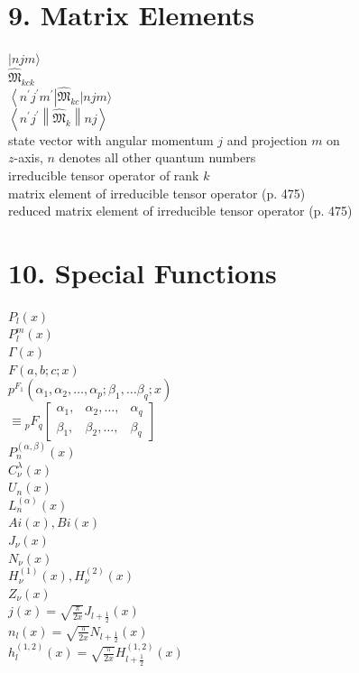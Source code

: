 \section*{9. Matrix Elements}
$|n j m\rangle$\\
$\widehat{\mathfrak{M}}_{k c k}$\\
$\left\langle n^{\prime} j^{\prime} m^{\prime}\right| \widehat{\mathfrak{M}}_{k c}|n j m\rangle$\\
$\left\langle n^{\prime} j^{\prime}\left\|\widehat{\mathfrak{M}}_{k}\right\| n j\right\rangle$\\
state vector with angular momentum $j$ and projection $m$ on\\
$z$-axis, $n$ denotes all other quantum numbers\\
irreducible tensor operator of rank $k$\\
matrix element of irreducible tensor operator (p. 475)\\
reduced matrix element of irreducible tensor operator (p. 475)

\section*{10. Special Functions}
$P_{l}(x)$\\
$P_{l}^{m}(x)$\\
$\Gamma(x)$\\
$F(a, b ; c ; x)$\\
$p^{F_{1}}\left(\alpha_{1}, \alpha_{2}, \ldots, \alpha_{p} ; \beta_{1}, \ldots \beta_{q} ; x\right)$\\
$\equiv{ }_{p} F_{q}\left[\begin{array}{llll}\alpha_{1}, & \alpha_{2}, \ldots, & \alpha_{q} \\ \beta_{1}, & \beta_{2}, \ldots, & \beta_{q}\end{array}\right]$\\
$P_{n}^{(\alpha, \beta)}(x)$\\
$C_{\nu}^{\lambda}(x)$\\
$U_{n}(x)$\\
$L_{n}^{(\alpha)}(x)$\\
$A i(x), B i(x)$\\
$J_{\nu}(x)$\\
$N_{\nu}(x)$\\
$H_{\nu}^{(1)}(x), H_{\nu}^{(2)}(x)$\\
$Z_{\nu}(x)$\\
$j(x)=\sqrt{\frac{\pi}{2 x}} J_{l+\frac{1}{2}}(x)$\\
$n_{l}(x)=\sqrt{\frac{\pi}{2 x}} N_{l+\frac{1}{2}}(x)$\\
$h_{l}^{(1,2)}(x)=\sqrt{\frac{\pi}{2 x}} H_{l+\frac{1}{2}}^{(1,2)}(x)$

